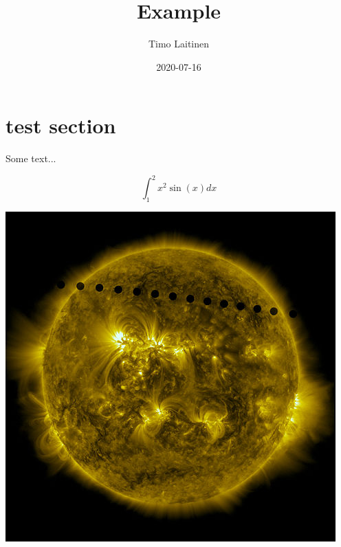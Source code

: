 \documentclass[]{book}
\title{Example}
\author{Timo Laitinen}
\date{2020-07-16}
\begin{document}
\maketitle

\section{test section}


Some text...


\begin{equation}
  \label{#eq:baa}
  \int_1^2 x^2\sin(x) dx
\end{equation}

\includegraphics[width=.7\linewidth]{480px-SDO_2012_Venus_Transit_-_Path_Sequence_-_Full_Sun.jpg}
\end{document}
